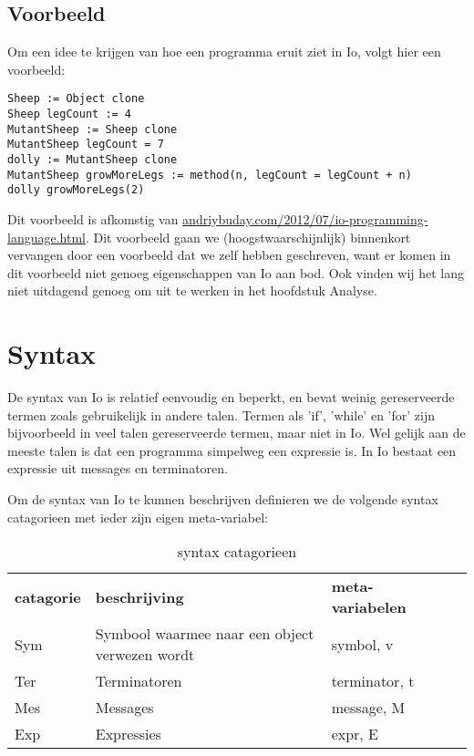 \documentclass[12pt]{article}
\begin{document}
\subsection*{Voorbeeld}
Om een idee te krijgen van hoe een programma eruit ziet in Io, volgt hier een voorbeeld:
\begin{lstlisting}[frame=single]
Sheep := Object clone
Sheep legCount := 4
MutantSheep := Sheep clone
MutantSheep legCount = 7
dolly := MutantSheep clone
MutantSheep growMoreLegs := method(n, legCount = legCount + n)
dolly growMoreLegs(2)
\end{lstlisting}
Dit voorbeeld is afkomstig van \url{andriybuday.com/2012/07/io-programming-language.html}.
Dit voorbeeld gaan we (hoogstwaarschijnlijk) binnenkort vervangen door een voorbeeld dat we zelf hebben geschreven, want er komen in dit voorbeeld niet genoeg
eigenschappen van Io aan bod. Ook vinden wij het lang niet uitdagend genoeg om uit te werken in het hoofdstuk Analyse.

\section{Syntax}

De syntax van Io is relatief eenvoudig en beperkt, en bevat weinig gereserveerde termen zoals gebruikelijk in andere talen. Termen als 'if', 'while' en 'for' zijn bijvoorbeeld in veel talen gereserveerde termen, maar niet in Io. Wel gelijk aan de meeste talen is dat een programma simpelweg een expressie is. In Io bestaat een expressie uit messages en terminatoren. 

Om de syntax van Io te kunnen beschrijven definieren we de volgende syntax catagorieen met ieder zijn eigen meta-variabel:

\begin{table}[]
	\centering
	\begin{tabular}{lllll}
		\textbf{catagorie} & \textbf{beschrijving}                          & \textbf{meta-variabelen} &  &  \\
		Sym                & Symbool waarmee naar een object verwezen wordt & symbol, v                      &  &  \\
		Ter                & Terminatoren                                   & terminator, t                      &  &  \\
		Mes                & Messages                                       & message, M                      &  &  \\
		Exp                & Expressies                                     & expr, E                      &  & 
	\end{tabular}
	\label{catagorieen}
	\caption{syntax catagorieen}
\end{table} 
\end{document}
